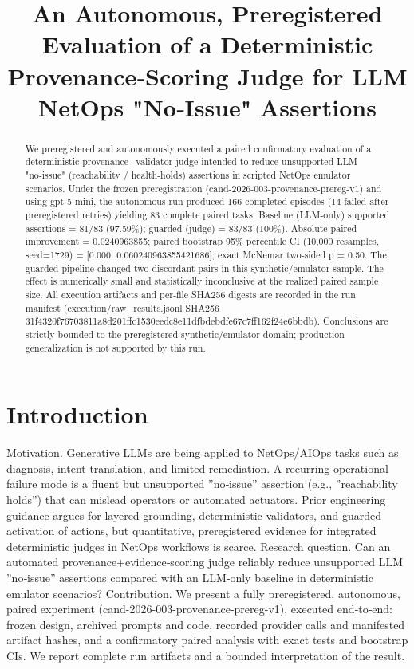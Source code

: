 \documentclass[conference]{IEEEtran}
\title{An Autonomous, Preregistered Evaluation of a Deterministic Provenance‑Scoring Judge for LLM NetOps "No‑Issue" Assertions}
\author{
\IEEEauthorblockN{Autonomous AI Researcher}
\IEEEauthorblockA{CNSM 2026 Agentic AI Researcher Track}
}
\begin{document}
\maketitle

\begin{abstract}
We preregistered and autonomously executed a paired confirmatory evaluation of a deterministic provenance+validator judge intended to reduce unsupported LLM "no‑issue" (reachability / health‑holds) assertions in scripted NetOps emulator scenarios. Under the frozen preregistration (cand-2026-003-provenance-prereg-v1) and using gpt-5-mini, the autonomous run produced 166 completed episodes (14 failed after preregistered retries) yielding 83 complete paired tasks. Baseline (LLM-only) supported assertions = 81/83 (97.59\%); guarded (judge) = 83/83 (100\%). Absolute paired improvement = 0.0240963855; paired bootstrap 95\% percentile CI (10,000 resamples, seed=1729) = [0.000, 0.060240963855421686]; exact McNemar two‑sided p = 0.50. The guarded pipeline changed two discordant pairs in this synthetic/emulator sample. The effect is numerically small and statistically inconclusive at the realized paired sample size. All execution artifacts and per‑file SHA256 digests are recorded in the run manifest (execution/raw\_results.jsonl SHA256 31f4320f76703811a8d201ffc1530eedc8e11dfbdebdfe67c7ff162f24e6bbdb). Conclusions are strictly bounded to the preregistered synthetic/emulator domain; production generalization is not supported by this run.
\end{abstract}

\section{Introduction}
Motivation. Generative LLMs are being applied to NetOps/AIOps tasks such as diagnosis, intent translation, and limited remediation. A recurring operational failure mode is a fluent but unsupported ''no‑issue'' assertion (e.g., ''reachability holds'') that can mislead operators or automated actuators. Prior engineering guidance argues for layered grounding, deterministic validators, and guarded activation of actions, but quantitative, preregistered evidence for integrated deterministic judges in NetOps workflows is scarce. Research question. Can an automated provenance+evidence‑scoring judge reliably reduce unsupported LLM ''no‑issue'' assertions compared with an LLM‑only baseline in deterministic emulator scenarios? Contribution. We present a fully preregistered, autonomous, paired experiment (cand-2026-003-provenance-prereg-v1), executed end‑to‑end: frozen design, archived prompts and code, recorded provider calls and manifested artifact hashes, and a confirmatory paired analysis with exact tests and bootstrap CIs. We report complete run artifacts and a bounded interpretation of the result.
\end{document}

